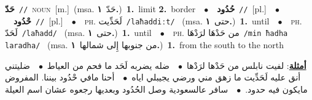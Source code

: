 \documentclass[10pt,a4paper,twoside]{article} %
\begin{document}
\begin{multicols}{2}
{\setlength\topsep{0pt}\textbf{\foreignlanguage{arabic}{حَدّ}}\ {\color{gray}\texttt{//}\color{black}}\ \textsc{noun}\ [m.]\ \color{gray}(msa. \foreignlanguage{arabic}{حَدّ}~\foreignlanguage{arabic}{\textbf{١.}})\color{black}\ \textbf{1.}~limit  \textbf{2.}~border\ \ $\bullet$\ \ \setlength\topsep{0pt}\textbf{\foreignlanguage{arabic}{حُدُود}}\ {\color{gray}\texttt{//}\color{black}}\ [pl.]\ \ $\bullet$\ \ \setlength\topsep{0pt}\textbf{\foreignlanguage{arabic}{حْدُود}}\ {\color{gray}\texttt{//}\color{black}}\ [pl.]\ \ $\bullet$\ \ \textsc{ph.} \color{gray} \foreignlanguage{arabic}{لَحَدِّيت}\color{black}\ {\color{gray}\texttt{/{\sffamily laħaddiːt}/}\color{black}}\ \color{gray} (msa. \foreignlanguage{arabic}{حتى}~\foreignlanguage{arabic}{\textbf{١.}})\color{black}\ \textbf{1.}~until\ \ $\bullet$\ \ \textsc{ph.} \color{gray} \foreignlanguage{arabic}{لَحَدّ}\color{black}\ {\color{gray}\texttt{/{\sffamily laħadd}/}\color{black}}\ \color{gray} (msa. \foreignlanguage{arabic}{حتى}~\foreignlanguage{arabic}{\textbf{١.}})\color{black}\ \textbf{1.}~until\ \ $\bullet$\ \ \textsc{ph.} \color{gray} \foreignlanguage{arabic}{من حَدْهَا لرَدْهَا}\color{black}\ {\color{gray}\texttt{/{\sffamily min ħadha laradha}/}\color{black}}\ \color{gray} (msa. \foreignlanguage{arabic}{من جنوبها إِلى شمالها}~\foreignlanguage{arabic}{\textbf{١.}})\color{black}\ \textbf{1.}~from the south to the north\  \begin{flushright}\color{gray}\foreignlanguage{arabic}{\textbf{\underline{\foreignlanguage{arabic}{أمثلة}}}: لفيت نابلس من حَدْها لرَدْها\ $\bullet$\ \  ضله يضربه لَحَد ما فحم من العياط\ $\bullet$\ \  ضليتني أنق عليه لَحَدِّيت ما زهق مني ورضي يجيبلي اياه\ $\bullet$\ \  أحنا مافي حْدُود بيننا. المفروض مايكون فيه حدود.\ $\bullet$\ \  سافر عالسعودية وصل الحُدُود وبعديها رجعوه عشان اسم العيلة}\end{flushright}\color{black}} \vspace{2mm}


\end{multicols}
\end{document}
